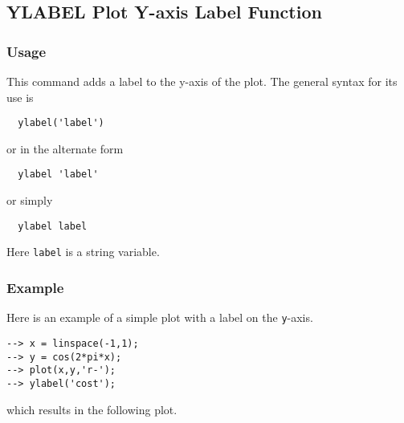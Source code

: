 %
%
%
\subsection{YLABEL Plot Y-axis Label Function}
\subsubsection{Usage}
This command adds a label to the y-axis of the plot.  The general syntax
for its use is
\begin{verbatim}
  ylabel('label')
\end{verbatim}
or in the alternate form
\begin{verbatim}
  ylabel 'label'
\end{verbatim}
or simply
\begin{verbatim}
  ylabel label
\end{verbatim}
Here \verb|label| is a string variable.
\subsubsection{Example}
Here is an example of a simple plot with a label on the \verb|y|-axis.
\begin{verbatim}
--> x = linspace(-1,1);
--> y = cos(2*pi*x);
--> plot(x,y,'r-');
--> ylabel('cost');
\end{verbatim}
which results in the following plot.

